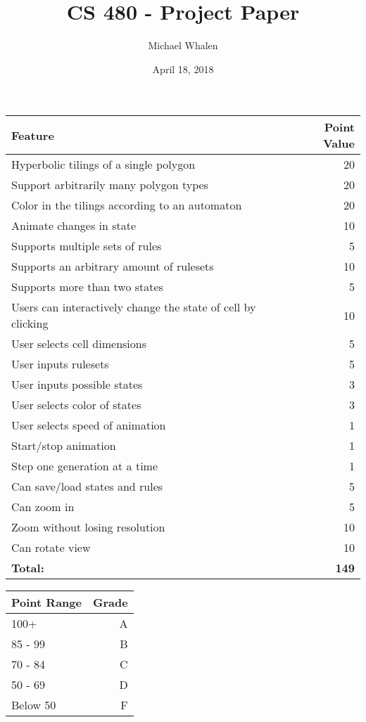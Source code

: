 \documentclass[letterpaper,12pt]{article}
\begin{document}
\title{CS 480 - Project Paper}
\author{Michael Whalen}
\date{April 18, 2018}
\maketitle



\begin{center}
  \begin{tabular}{ | l | r | }
    \hline
    \textbf{Feature} & \textbf{Point Value} \\ \hline
    Hyperbolic tilings of a single polygon & 20 \\ \hline
    Support arbitrarily many polygon types & 20 \\ \hline
    Color in the tilings according to an automaton & 20 \\ \hline
    Animate changes in state & 10 \\ \hline
    Supports multiple sets of rules & 5 \\ \hline
	Supports an arbitrary amount of rulesets & 10 \\ \hline
	Supports more than two states & 5 \\ \hline
	Users can interactively change the state of cell by clicking & 10 \\ \hline
	User selects cell dimensions & 5 \\ \hline
	User inputs rulesets & 5 \\ \hline
	User inputs possible states & 3 \\ \hline
	User selects color of states & 3 \\ \hline
	User selects speed of animation & 1 \\ \hline
	Start/stop animation & 1 \\ \hline
	Step one generation at a time & 1 \\ \hline
	Can save/load states and rules & 5 \\ \hline
	Can zoom in & 5 \\ \hline
	Zoom without losing resolution & 10 \\ \hline
	Can rotate view & 10 \\ \hline
	\textbf{Total:} & \textbf{149} \\ \hline

  \end{tabular}
\end{center}

\begin{center}
  \begin{tabular}{ | l | r | }
    \hline
    \textbf{Point Range} & \textbf{Grade} \\ \hline
    100+ & A \\ \hline
    85 - 99 & B \\ \hline
    70 - 84 & C \\ \hline
    50 - 69 & D \\ \hline
    Below 50 & F \\ \hline

  \end{tabular}
\end{center}
\end{document}
